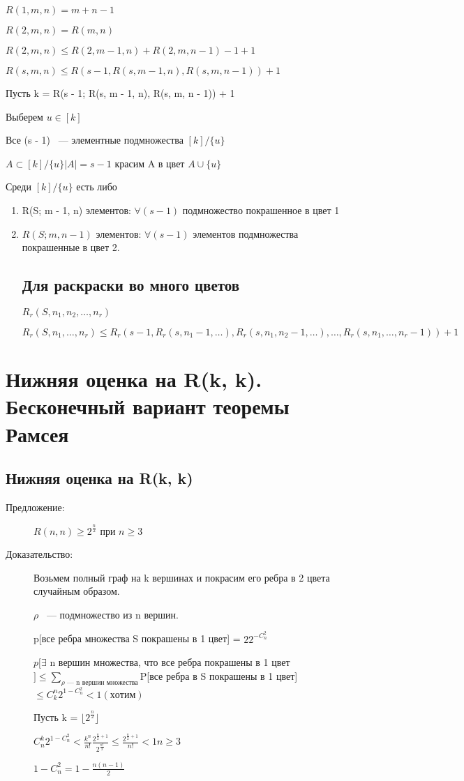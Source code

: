 \documentclass[12pt]{article}
\begin{document}
$R(1, m, n) = m + n - 1$

$R(2, m, n) = R(m, n)$ 

$R(2, m, n) \le R(2, m -1, n) + R(2, m, n - 1) - 1 + 1$

$R(s, m, n) \le R(s - 1, R(s, m - 1, n), R(s, m, n - 1)) + 1$

Пусть k  = R(s - 1; R(s, m - 1, n), R(s, m, n - 1)) + 1

Выберем $u \in [k]$

Все (s - 1) ~--- элементные подмножества $[k]/\{u\}$

$A \subset [k]/\{u\} |A| = s - 1$ красим A в цвет $A \cup \{u\}$

Среди $[k] /\{u\}$ есть либо 
\begin{enumerate}
\item R(S; m - 1, n) элементов: $\forall (s - 1)$ подмножество покрашенное в цвет 1
\item $R(S; m, n - 1)$ элементов: $\forall (s - 1)$ элементов подмножества покрашенные в цвет 2.

\subsection{Для раскраски во много цветов}

$R_r(S, n_1, n_2, \ldots, n_r)$

$R_r(S, n_1, \ldots, n_r) \le R_r(s - 1, R_r(s, n_1 - 1, \ldots), R_r(s, n_1, n_2 - 1, \ldots), \ldots, R_r(s, n_1, \ldots, n_r - 1)) + 1$
\end{enumerate}

\section{Нижняя оценка на R(k, k). Бесконечный вариант теоремы Рамсея}

\subsection{Нижняя оценка на R(k, k)}

\begin{description}
\item[Предложение:] $R(n, n) \ge 2^{\frac{n}{2}}$ при $n \ge 3$
\item[Доказательство:] Возьмем полный граф на k вершинах и покрасим его ребра в 2 цвета случайным образом. 

$\rho$ ~--- подмножество из n вершин.

p[все ребра множества S покрашены в 1 цвет] = $22^{-C_n^2}$

$p[\exists$ n вершин множества, что все ребра покрашены в 1 цвет$] \le \sum_{\rho \text{~--- n вершин множества}}$P[все ребра в S покрашены в 1 цвет] $\le C_k^n 2^{1 - C_n^2} < 1(хотим)$

Пусть k = $\lfloor 2^{\frac{n}{2}} \rfloor$

$C_n^k2^{1 - C_n^2} < \frac{k^n}{n!}\frac{2^{\frac{n}{2} + 1}}{2^{\frac{n^2}{2}}} \le \frac{2^{\frac{n}{2} + 1}}{n!} < 1 n \ge 3$

$1 - C_n^2 = 1 - \frac{n(n - 1)}{2}$

\end{description}
\end{document}
